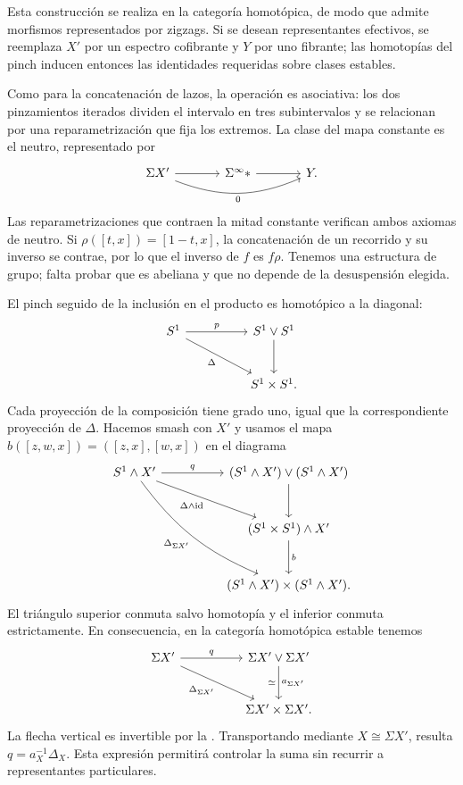 Esta construcción se realiza en la categoría homotópica, de modo que admite morfismos representados por zigzags. Si se desean representantes efectivos, se reemplaza $X'$ por un espectro cofibrante y $Y$ por uno fibrante; las homotopías del pinch inducen entonces las identidades requeridas sobre clases estables.

Como para la concatenación de lazos, la operación es asociativa: los dos pinzamientos iterados dividen el intervalo en tres subintervalos y se relacionan por una reparametrización que fija los extremos. La clase del mapa constante es el neutro, representado por
\[
\begin{tikzcd}[column sep=large]
\Sigma X'\arrow[r]\arrow[rr,bend right=22,"0"']&\Sigma^\infty *\arrow[r]&Y.
\end{tikzcd}
\]
Las reparametrizaciones que contraen la mitad constante verifican ambos axiomas de neutro. Si $\rho([t,x])=[1-t,x]$, la concatenación de un recorrido y su inverso se contrae, por lo que el inverso de $f$ es $f\rho$. Tenemos una estructura de grupo; falta probar que es abeliana y que no depende de la desuspensión elegida.

El pinch seguido de la inclusión en el producto es homotópico a la diagonal:
\[
\begin{tikzcd}[column sep=huge,row sep=large]
S^1\arrow[r,"p"]\arrow[dr,"\Delta"']&S^1\vee S^1\arrow[d]\\
&S^1\times S^1.
\end{tikzcd}
\]
Cada proyección de la composición tiene grado uno, igual que la correspondiente proyección de $\Delta$. Hacemos smash con $X'$ y usamos el mapa $b([z,w,x])=([z,x],[w,x])$ en el diagrama
\[
\begin{tikzcd}[column sep=huge,row sep=large]
S^1\wedge X'\arrow[r,"q"]\arrow[dr,"\Delta\wedge\id"']\arrow[ddr,bend right=15,"\Delta_{\Sigma X'}"']
&(S^1\wedge X')\vee(S^1\wedge X')\arrow[d]\\
&(S^1\times S^1)\wedge X'\arrow[d,"b"]\\
&(S^1\wedge X')\times(S^1\wedge X').
\end{tikzcd}
\]
El triángulo superior conmuta salvo homotopía y el inferior conmuta estrictamente. En consecuencia, en la categoría homotópica estable tenemos
\[
\begin{tikzcd}[column sep=huge,row sep=large]
\Sigma X'\arrow[r,"q"]\arrow[dr,"\Delta_{\Sigma X'}"']
&\Sigma X'\vee\Sigma X'\arrow[d,"a_{\Sigma X'}","\simeq"']\\
&\Sigma X'\times\Sigma X'.
\end{tikzcd}
\]
La flecha vertical es invertible por la . Transportando mediante $X\cong\Sigma X'$, resulta $q=a_X^{-1}\Delta_X$. Esta expresión permitirá controlar la suma sin recurrir a representantes particulares.

